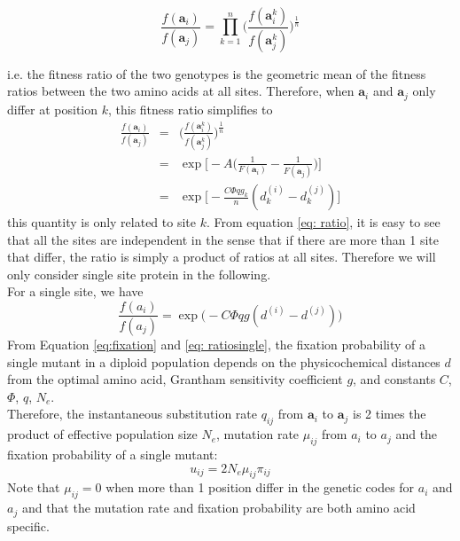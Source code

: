 \documentclass[13pt]{article}
\begin{document}
\begin{equation}
\frac{f(\mathbf{a}_i)}{f(\mathbf{a}_j)} = \prod_{k=1}^n\Big( \frac{f(\mathbf{a}_i^k)}{f(\mathbf{a}_j^k)}\Big)^{\frac{1}{n}}
\end{equation}


i.e. the fitness ratio of the two genotypes is the geometric mean of the fitness ratios between the two amino acids at all sites. Therefore, when $\mathbf{a}_i$ and $\mathbf{a}_j$ only differ at position $k$, this fitness ratio simplifies to  
\begin{eqnarray}
\frac{f(\mathbf{a}_i)}{f(\mathbf{a}_j)} & = & \Big( \frac{f(\mathbf{a}_i^k)}{f(\mathbf{a}_j^k)}\Big)^{\frac{1}{n}}\\
 & = &\exp \Big[-A\Big( \frac{1}{F(\mathbf{a}_i )} - \frac{1}{F(\mathbf{a}_j )}\Big)\Big] \nonumber\\
& = & \exp\Big[ -\frac{C\Phi q g_k}{n}(d_k^{(i)} - d_k^{(j)})\Big] \label{eq: ratio}
\end{eqnarray}
\noindent
this quantity is only related to site $k$. From equation \ref{eq: ratio}, it is easy to see that all the sites are independent in the sense that if there are more than 1 site that differ, the ratio is simply a product of ratios at all sites. Therefore we will only consider single site protein in the following.\\

For a single site, we have 
\begin{equation}
\frac{f(a_i)}{f(a_j)} = \exp\Big(-C\Phi q g(d^{(i)}-d^{(j)})\Big)
\label{eq: ratiosingle}
\end{equation}
From Equation \ref{eq:fixation} and \ref{eq: ratiosingle}, the fixation probability of a single mutant in a diploid population depends on the physicochemical distances $d$ from the optimal amino acid, Grantham sensitivity coefficient $g$, and constants $C$, $\Phi$, $q$, $N_e$.\\


Therefore, the instantaneous substitution rate $q_{ij}$ from $\mathbf{a}_i$ to $\mathbf{a}_j$ is 2 times the product of effective population size $N_e$, mutation rate $\mu_{ij}$ from $a_i$ to $a_j$ and the fixation probability of a single mutant:
\begin{equation}
u_{ij} = 2N_e \mu_{ij} \pi_{ij}
\label{eq:subrate}
\end{equation}
Note that $\mu_{ij} = 0$ when more than 1 position differ in the genetic codes for $a_i$ and $a_j$ and that the mutation rate and fixation probability are both amino acid specific. \\
\end{document}
